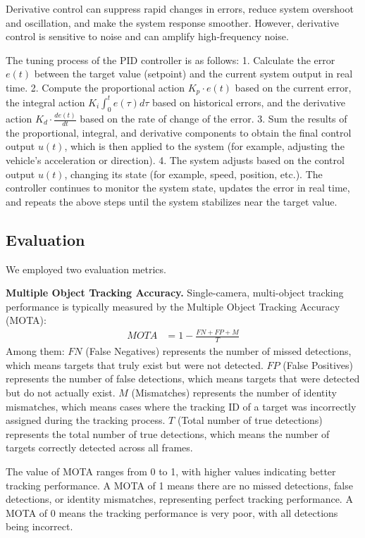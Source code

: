 Derivative control can suppress rapid changes in errors, reduce system overshoot and oscillation, and make the system response smoother. 
However, derivative control is sensitive to noise and can amplify high-frequency noise.


The tuning process of the PID controller is as follows:  
1. Calculate the error $e(t)$ between the target value (setpoint) and the current system output in real time.  
2. Compute the proportional action $K_{p} \cdot e(t)$ based on the current error, the integral action $K_{i} \int_{0}^{t} e(\tau) d \tau$ based on historical errors, and the derivative action $K_{d} \cdot \frac{d e(t)}{d t}$ based on the rate of change of the error.  
3. Sum the results of the proportional, integral, and derivative components to obtain the final control output $u(t)$, which is then applied to the system (for example, adjusting the vehicle's acceleration or direction). 
4. The system adjusts based on the control output $u(t)$, changing its state (for example, speed, position, etc.). 
The controller continues to monitor the system state, updates the error in real time, and repeats the above steps until the system stabilizes near the target value.


\subsection{Evaluation}

We employed two evaluation metrics.

\textbf{Multiple Object Tracking Accuracy.}
Single-camera, multi-object tracking performance is typically measured by the Multiple Object Tracking Accuracy (MOTA):
\begin{align}
	\mathit{MOTA} & = 1-\frac{F N+F P+M}{T}
\end{align}
Among them:
$FN$ (False Negatives) represents the number of missed detections, which means targets that truly exist but were not detected.
$FP$ (False Positives) represents the number of false detections, which means targets that were detected but do not actually exist.
$M$ (Mismatches) represents the number of identity mismatches, which means cases where the tracking ID of a target was incorrectly assigned during the tracking process.
$T$ (Total number of true detections) represents the total number of true detections, which means the number of targets correctly detected across all frames.

The value of MOTA ranges from 0 to 1, with higher values indicating better tracking performance. 
A MOTA of 1 means there are no missed detections, false detections, or identity mismatches, representing perfect tracking performance. 
A MOTA of 0 means the tracking performance is very poor, with all detections being incorrect.

